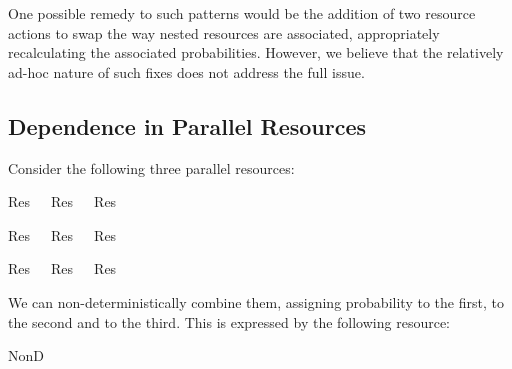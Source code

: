 \documentclass[class=smolathesis,crop=false]{standalone}
\begin{document}
One possible remedy to such patterns would be the addition of two resource actions to swap the way nested  resources are associated, appropriately recalculating the associated probabilities.
However, we believe that the relatively ad-hoc nature of such fixes does not address the full issue.

\subsection{Dependence in Parallel Resources}
\label{sec:prob/limit/dependence}

Consider the following three parallel resources:
\begin{isabelle}
\centering
  Res\ \ \isasymodot\ Res\ \ \isasymodot\ Res\ 
\item
  Res\ \ \isasymodot\ Res\ \ \isasymodot\ Res\ 
\item
  Res\ \ \isasymodot\ Res\ \ \isasymodot\ Res\ 
\end{isabelle}

We can non-deterministically combine them, assigning probability  to the first,  to the second and  to the third.
This is expressed by the following resource:
\begin{center}
  \begin{minipage}{0.6\textwidth}
    \begin{isabelle}
      NonD\ \isanewline
      \isanewline
    \end{isabelle}
  \end{minipage}
\end{center}
\end{document}
